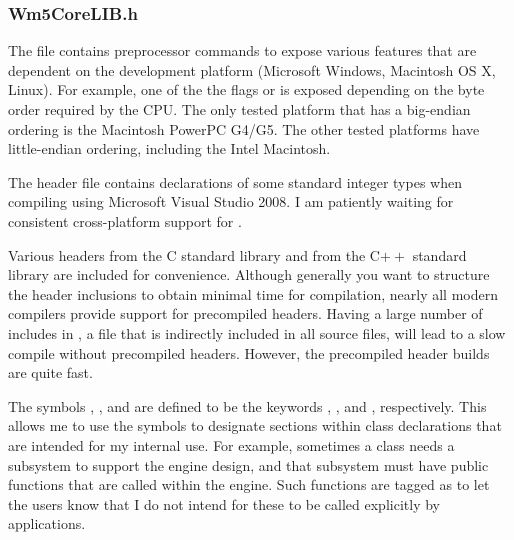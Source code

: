 \documentclass{article}
\begin{document}
\subsubsection{Wm5CoreLIB.h}
\label{subsubsec.corelib}

The file  contains preprocessor commands to expose various
features that are dependent on the development platform (Microsoft Windows,
Macintosh OS X, Linux).  For example, one of the the flags
 or  is exposed depending
on the byte order required by the CPU.  The only tested platform that has
a big-endian ordering is the Macintosh PowerPC G4/G5.  The other tested
platforms have little-endian ordering, including the Intel Macintosh.

The header file contains declarations of some standard integer types when
compiling using Microsoft Visual Studio 2008.  I am patiently waiting for
consistent cross-platform support for .

Various headers from the C standard library and from the C$++$ standard library
are included for convenience.  Although generally you want to structure the
header inclusions to obtain minimal time for compilation, nearly all modern
compilers provide support for precompiled headers.  Having a large number of
includes in , a file that is indirectly included in all
source files, will lead to a slow compile without precompiled headers.  However,
the precompiled header builds are quite fast.

The symbols , , and
 are defined to be the keywords ,
, and , respectively.  This allows me to
use the  symbols to designate sections within class
declarations that are intended for my internal use.  For example, sometimes a
class needs a subsystem to support the engine design, and that subsystem must
have public functions that are called within the engine.  Such functions are
tagged as  to let the users know that I do not
intend for these to be called explicitly by applications.
\end{document}
